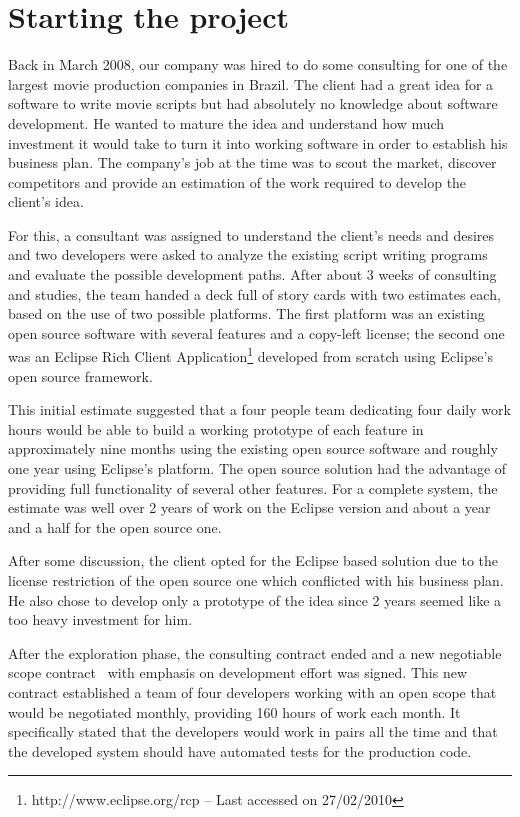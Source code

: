 \documentclass[lnbip]{svmultln}
\begin{document}
\section{Starting the project}
\label{sec:start}

Back in March 2008, our company was hired to do some consulting for
one of the largest movie production companies in Brazil. The client
had a great idea for a software to write movie scripts but had
absolutely no knowledge about software development.  He wanted to
mature the idea and understand how much investment it would take to
turn it into working software in order to establish his business
plan. The company's job at the time was to scout the market, discover
competitors and provide an estimation of the work required to develop
the client's idea.

For this, a consultant was assigned to understand the client's needs
and desires and two developers were asked to analyze the existing
script writing programs and evaluate the possible development
paths. After about 3 weeks of consulting and studies, the team handed
a deck full of story cards with two estimates each, based on the use
of two possible platforms. The first platform was an existing open
source software with several features and a copy-left license; the
second one was an Eclipse Rich Client
Application\footnote{http://www.eclipse.org/rcp -- Last accessed on
  27/02/2010} developed from scratch using Eclipse's open source
framework.

This initial estimate suggested that a four people team dedicating
four daily work hours would be able to build a working prototype of
each feature in approximately nine months using the existing open
source software and roughly one year using Eclipse's platform. The
open source solution had the advantage of providing full functionality
of several other features. For a complete system, the estimate was
well over 2 years of work on the Eclipse version and about a year and
a half for the open source one.

After some discussion, the client opted for the Eclipse based solution
due to the license restriction of the open source one which conflicted
with his business plan. He also chose to develop only a prototype of
the idea since 2 years seemed like a too heavy investment for him.

After the exploration phase, the consulting contract ended and a new
negotiable scope contract~\cite{XP} with emphasis on development
effort was signed. This new contract established a team of four
developers working with an open scope that would be negotiated
monthly, providing 160 hours of work each month. It specifically
stated that the developers would work in pairs all the time and that
the developed system should have automated tests for the production
code.
\end{document}
